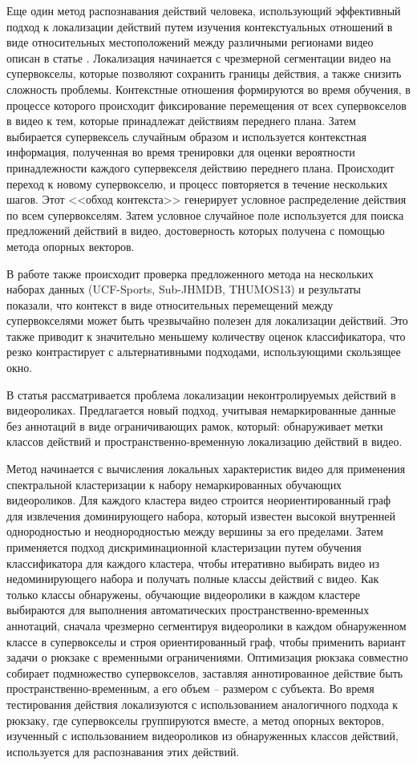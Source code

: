 Еще один метод распознавания действий человека, использующий эффективный подход к локализации
действий путем изучения контекстуальных отношений в виде относительных местоположений между различными регионами видео описан в статье \cite{time3}. Локализация начинается  
с чрезмерной сегментации видео на супервокселы, которые
позволяют сохранить границы действия, а также снизить
сложность проблемы. Контекстные отношения формируются
во время обучения, в процессе которого происходит  фиксирование перемещения от всех
супервокселов в видео к тем, которые принадлежат действиям переднего плана. Затем выбирается супервексель
случайным образом и используется контекстная информация, полученная во время
тренировки для оценки вероятности принадлежности каждого супервекселя действию переднего плана. Происходит переход к
новому супервокселю, и процесс повторяется в течение нескольких шагов. Этот <<обход контекста>> генерирует условное распределение
действия по всем супервокселям. Затем условное случайное поле используется для поиска предложений действий в видео,
достоверность которых получена с помощью метода опорных векторов. 

В работе также происходит проверка 
предложенного метода на нескольких наборах данных (UCF-Sports, Sub-JHMDB, THUMOS13) и результаты показали, что
контекст в виде относительных перемещений между супервокселями может быть чрезвычайно полезен для локализации действий. Это также приводит к значительно меньшему количеству оценок
классификатора, что резко контрастирует с альтернативными подходами, использующими скользящее окно. 

В статья \cite{time4} рассматривается проблема локализации неконтролируемых действий в видеороликах. Предлагается новый подход, учитывая немаркированные
данные без аннотаций в виде ограничивающих рамок, который:  обнаруживает метки классов действий
и пространственно-временную локализацию действий в видео. 

Метод
начинается с вычисления локальных характеристик видео для применения спектральной кластеризации к набору немаркированных обучающих видеороликов.
Для каждого кластера видео строится неориентированный граф для извлечения доминирующего набора, который известен
высокой внутренней однородностью и неоднородностью между
вершины за его пределами. Затем применяется подход дискриминационной кластеризации путем обучения классификатора для каждого кластера, чтобы итеративно выбирать видео из недоминирующего набора
и получать полные классы действий с видео. Как только классы
обнаружены, обучающие видеоролики в каждом кластере
выбираются для выполнения автоматических пространственно-временных аннотаций, сначала чрезмерно сегментируя видеоролики в каждом обнаруженном
классе в супервокселы и строя ориентированный граф, чтобы применить вариант задачи о рюкзаке с временными
ограничениями. Оптимизация рюкзака совместно собирает
подмножество супервокселов, заставляя аннотированное действие быть пространственно-временным, а его объем
-- размером с субъекта. Во время тестирования действия
локализуются с использованием аналогичного подхода к рюкзаку, где
супервокселы группируются вместе, а метод опорных векторов, изученный с использованием видеороликов из обнаруженных классов действий, используется для
распознавания этих действий. 

